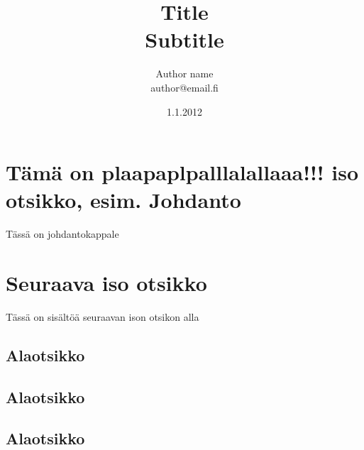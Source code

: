 \documentclass[a4paper]{article}
\begin{document}
\title{\huge Title \\ \large Subtitle}
\date{1.1.2012}
\author{Author name \\ author@email.fi}
\maketitle

\large

\section{Tämä on plaapaplpalllalallaaa!!! iso otsikko, esim. Johdanto}

Tässä on johdantokappale

\section{Seuraava iso otsikko}

Tässä on sisältöä seuraavan ison otsikon alla

\subsection{Alaotsikko}

\subsection{Alaotsikko}

\subsection{Alaotsikko}
\end{document}
